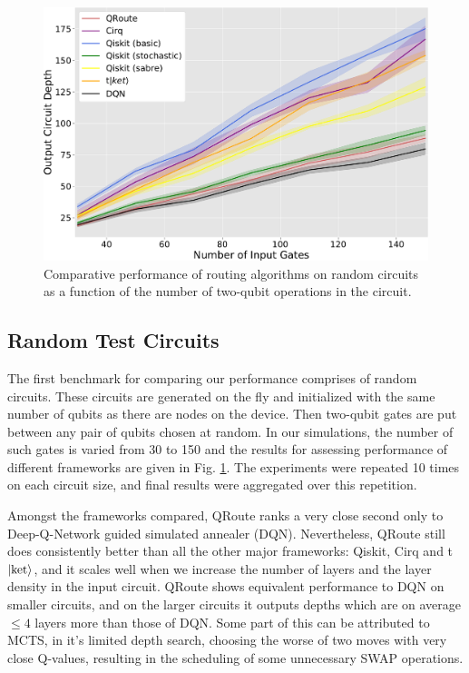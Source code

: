 \begin{figure}[t]
    \includegraphics[width=\linewidth]{figures/qroute/random_benchmark.pdf}
    \caption[qRoute Results on randomly generated circuits]{\label{fig:results-random}
        Comparative performance of routing algorithms on random circuits as a function of the number of two-qubit operations in the circuit.}
\end{figure}

\subsection{\label{sec:results-random}Random Test Circuits}

The first benchmark for comparing our performance comprises of random circuits. These circuits are generated on the fly and initialized with the same number of qubits as there are nodes on the device. Then two-qubit gates are put between any pair of qubits chosen at random. In our simulations, the number of such gates is varied from 30 to 150 and the results for assessing performance of different frameworks are given in Fig. \ref{fig:results-random}. The experiments were repeated 10 times on each circuit size, and final results were aggregated over this repetition. 


Amongst the frameworks compared, QRoute ranks a very close second only to Deep-Q-Network guided simulated annealer (DQN). Nevertheless, QRoute still does consistently better than all the other major frameworks: Qiskit, Cirq and t$\ket{\text{ket}}$, and it scales well when we increase the number of layers and the layer density in the input circuit. QRoute shows equivalent performance to DQN on smaller circuits, and on the larger circuits it outputs depths which are on average $\leq 4$ layers more than those of DQN. Some part of this can be attributed to MCTS, in it's limited depth search, choosing the worse of two moves with very close Q-values, resulting in the scheduling of some unnecessary SWAP operations.


